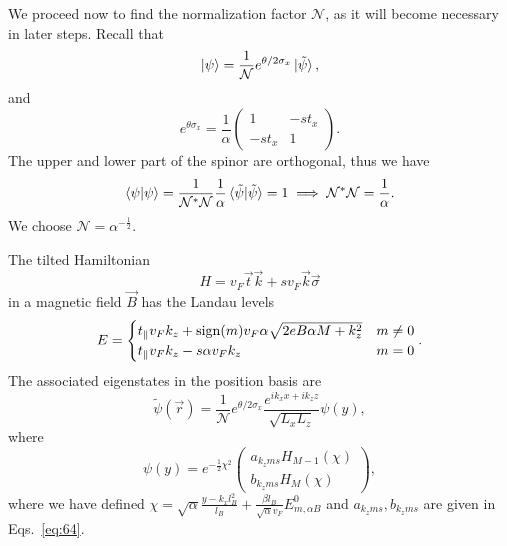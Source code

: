 We proceed now to find the normalization factor \( \mathcal{N} \), as it will become necessary in later steps.
Recall that
\[
  \ket{\psi} = \frac{1}{\mathcal{N}} e^{\theta /2 \sigma _x} \ket{\tilde{\psi}},
\]
and
\[
e^{\theta \sigma _x} =
\frac{1}{\alpha }
\begin{pmatrix}
  1 & -s t_x\\
  -s t_x & 1
\end{pmatrix}.
\]
The upper and lower part of the spinor are orthogonal, thus we have
\begin{equation}
  \label{eq:65}
  \braket{\psi  | \psi } = \frac{1}{\mathcal{N}^{*} \mathcal{N}} \frac{1}{\alpha } \braket{\tilde{\psi}  | \tilde{\psi} } = 1 \implies \mathcal{N}^{*}\mathcal{N} = \frac{1}{\alpha }.
\end{equation}
We choose \( \mathcal{N} = \alpha^{-\frac{1}{2}} \).

\begin{Proposition}
  The tilted Hamiltonian
  \[
    H = v_F \vec{t} \vec{k} + s v_F \vec{k} \vec{\sigma}
  \]
  in a magnetic field \( \vec{B} \) has the Landau levels
  \[
    E =
    \begin{cases}
      t_{\parallel} v_F k_z + \operatorname{sign}(m) v_F \alpha \sqrt{2 e B \alpha M + k_{z} ^2} & m \neq 0\\
      t_{\parallel} v_F k_z - s \alpha v_F k_z & m = 0
    \end{cases}.
  \]
  The associated eigenstates in the position basis are
  \[
    \tilde{\psi}(\vec{r}) = \frac{1}{\mathcal{N}} e^{\theta /2 \sigma_x}
    \frac{
      e^{ik_{x} x + ik_{z} z}
    }{
      \sqrt{L_{x}  L_z}
    } \psi(y),
    \]
    where
    \[
      \psi(y) = e^{-\frac{1}{2} \chi^2}
      \begin{pmatrix}
        a_{k_z m s} H_{M - 1} (\chi) \\
        b_{k_z m s} H_M (\chi)
      \end{pmatrix},
    \]
    where we have defined \( \chi = \sqrt{\alpha} \frac{ y - k_x l_B^2 }{l_{B}} + \frac{\beta l_B}{\sqrt{\alpha} v_{F}} E^0_{m, \alpha B} \) and \( a_{k_z m s}, b_{k_z m s} \) are given in Eqs.~\eqref{eq:64}.
\end{Proposition}

